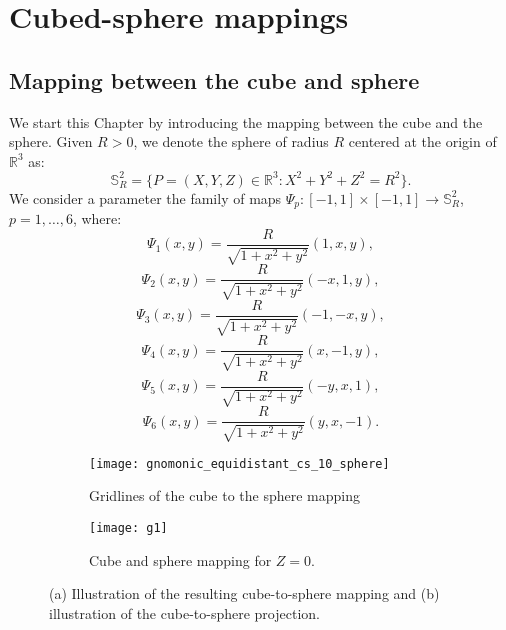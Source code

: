 \section{Cubed-sphere mappings}
\label{cs-mappings}
\subsection{Mapping between the cube and sphere}
\label{equidistant-cs}
We start this Chapter by introducing the mapping between the cube and the sphere.
Given $R>0$, we denote the sphere of radius $R$ 
centered at the origin of  $\mathbb{R}^3$ as:
\begin{equation*}
	\mathbb{S}^2_R = \{ P = (X,Y,Z) \in \mathbb{R}^3: X^2 + Y^2 + Z^2 = R^2\}.
\end{equation*}
We consider a parameter %
the family of maps
$\Psi_{p}: [-1,1] \times [-1,1] \to \mathbb{S}^2_R$, $p=1, \ldots, 6$,
where:
\begin{equation*}
	\Psi_{1}(x,y) = \frac{R}{\sqrt{1 + x^2 + y^2}}(1, x, y), 
\end{equation*}
\begin{equation*}
	\Psi_{2}(x,y) = \frac{R}{\sqrt{1 + x^2 + y^2}}(-x, 1, y), 
\end{equation*}
\begin{equation*}
	\Psi_{3}(x,y) = \frac{R}{\sqrt{1 + x^2 + y^2}}(-1, -x, y), 
\end{equation*}
\begin{equation*}
	\Psi_{4}(x,y) = \frac{R}{\sqrt{1 + x^2 + y^2}}(x, -1, y), 
\end{equation*}
\begin{equation*}
	\Psi_{5}(x,y) = \frac{R}{\sqrt{1 + x^2 + y^2}}(-y, x, 1), 
\end{equation*}
\begin{equation*}
	\Psi_{6}(x,y) = \frac{R}{\sqrt{1 + x^2 + y^2}}(y, x, -1).
\end{equation*}

\begin{figure}[!htb]
	\centering
	\begin{subfigure}{0.45\textwidth}
	\texttt{[image: gnomonic\_equidistant\_cs\_10\_sphere]}
	\caption{Gridlines of the cube to the sphere mapping}
	\end{subfigure}
	\begin{subfigure}{0.45\textwidth}
	\centering
	\texttt{[image: g1]}
	\caption{Cube and sphere mapping for $Z=0$.}
	\end{subfigure}
	\caption{(a) Illustration of the resulting cube-to-sphere mapping and (b) illustration of the cube-to-sphere projection.\label{chp-cs-cubesphere}}
\end{figure}

